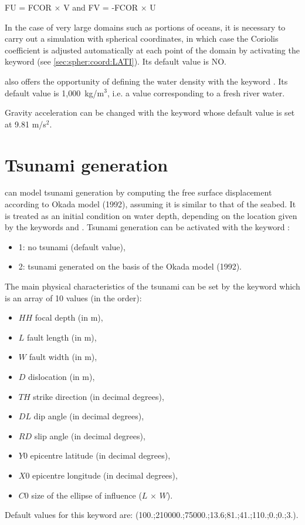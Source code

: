 FU = FCOR $\times$ V         and         FV = -FCOR $\times$ U

In the case of very large domains such as portions of oceans,
it is necessary to carry out a simulation with spherical coordinates,
in which case the Coriolis coefficient is adjusted automatically at each point
of the domain by activating the keyword 
(see \ref{sec:spher:coord:LATI}).
Its default value is NO.

 also offers the opportunity of defining the water density
with the keyword .
Its default value is 1,000~kg/m$^3$, i.e. a value corresponding to a fresh river
water.

Gravity acceleration can be changed with the keyword 
whose default value is set at 9.81 m/s$^2$.


\section{Tsunami generation}

 can model tsunami generation by computing the free surface
displacement according to Okada model (1992), assuming it is similar to that
of the seabed.
It is treated as an initial condition on water depth, depending on the
location given by the keywords
 and .
Tsunami generation can be activated with the keyword
:
\begin{itemize}
\item 1: no tsunami (default value),
\item 2: tsunami generated on the basis of the Okada model (1992).
\end{itemize}

The main physical characteristics of the tsunami can be set by the keyword
 which is an array of
10 values (in the order):
\begin{itemize}
\item $HH$ focal depth (in m),
\item $L$ fault length (in m),
\item $W$ fault width (in m),
\item $D$ dislocation (in m),
\item $TH$ strike direction (in decimal degrees),
\item $DL$ dip angle (in decimal degrees),
\item $RD$ slip angle (in decimal degrees),
\item $Y0$ epicentre latitude (in decimal degrees),
\item $X0$ epicentre longitude (in decimal degrees),
\item $C0$ size of the ellipse of influence ($L$ $\times$ $W$).
\end{itemize}
Default values for this keyword are:
(100.;210000.;75000.;13.6;81.;41.;110.;0.;0.;3.).


